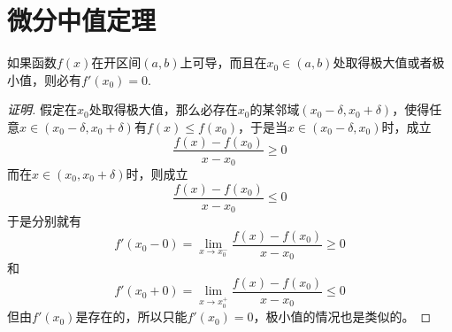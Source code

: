 
\section{微分中值定理}
\label{sec:differential-mean-value-theorems}

\begin{theorem}[罗尔定理]
  如果函数$f(x)$在开区间$(a,b)$上可导，而且在$x_0 \in (a,b)$处取得极大值或者极小值，则必有$f'(x_0)=0$.
\end{theorem}

\begin{proof}[证明]
  假定在$x_0$处取得极大值，那么必存在$x_0$的某邻域$(x_0-\delta,x_0+\delta)$，使得任意$x \in (x_0-\delta,x_0+\delta)$有$f(x) \leqslant f(x_0)$，于是当$x \in (x_0-\delta, x_0)$时，成立
  \[ \frac{f(x)-f(x_0)}{x-x_0} \geqslant 0 \]
  而在$x \in (x_0,x_0+\delta)$时，则成立
  \[ \frac{f(x)-f(x_0)}{x-x_0} \leqslant 0 \]
  于是分别就有
  \[ f'(x_0-0) = \lim_{x \to x_0^-} \frac{f(x)-f(x_0)}{x-x_0} \geqslant 0 \]
  和
  \[ f'(x_0+0) = \lim_{x \to x_0^+} \frac{f(x)-f(x_0)}{x-x_0} \leqslant 0 \]
  但由$f'(x_0)$是存在的，所以只能$f'(x_0)=0$，极小值的情况也是类似的。
\end{proof}

